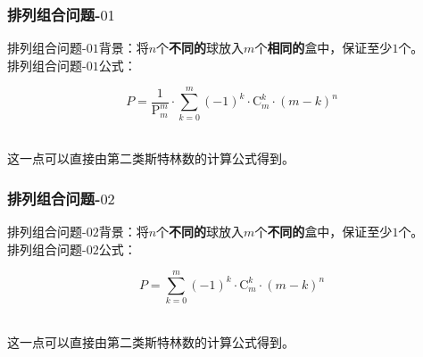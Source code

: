\documentclass[UTF8]{ctexart}
\newcommand{\rnum}[1]{\uppercase\expandafter{\romannumeral #1\relax}}
\begin{document}
\subsubsection{排列组合问题\rnum{3}-$01$}
    排列组合问题\rnum{3}-$01$背景：将$n$个\textbf{不同的}球放入$m$个\textbf{相同的}盒中，保证至少$1$个。\\[3mm]
    排列组合问题\rnum{3}-$01$公式：
    \begin{large}
        \begin{equation*}
            P=\frac{1}{\mathrm{P}_m^m}\cdot\sum_{k=0}^{m}(-1)^k\cdot\mathrm{C}_m^k\cdot(m-k)^n
        \end{equation*}
    \end{large}\\
    这一点可以直接由第二类斯特林数的计算公式得到。\\

\subsubsection{排列组合问题\rnum{3}-$02$}
    排列组合问题\rnum{3}-$02$背景：将$n$个\textbf{不同的}球放入$m$个\textbf{不同的}盒中，保证至少$1$个。\\[3mm]
    排列组合问题\rnum{3}-$02$公式：
    \begin{large}
        \begin{equation*}
            P=\sum_{k=0}^{m}(-1)^k\cdot\mathrm{C}_m^k\cdot(m-k)^n    
        \end{equation*}
    \end{large}\\
    这一点可以直接由第二类斯特林数的计算公式得到。

\newpage
\end{document}
